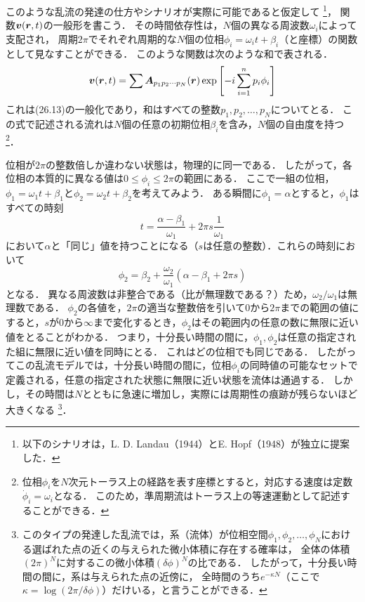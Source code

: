 このような乱流の発達の仕方やシナリオが実際に可能であると仮定して
\footnote{以下のシナリオは，L. D. Landau（1944）とE. Hopf（1948）が独立に提案した．}，
関数$\vb*{v}(\vb*{r},t)$の一般形を書こう．
その時間依存性は，$N$個の異なる周波数$\omega_i$によって支配され，
周期$2\pi$でそれぞれ周期的な$N$個の位相$\phi_i=\omega_it+\beta_i$（と座標）の関数として見なすことができる．
このような関数は次のような和で表される．
\begin{equation}
    \v(\vec{r},t) = \sum \vec{A}_{p_1p_2\cdots p_N}(\vec{r}) \exp\bqty{ -i \sum_{i=1}^{n} p_i\phi_i }
\end{equation}
これは(26.13)の一般化であり，和はすべての整数$p_1, p_2, \ldots , p_N$についてとる．
この式で記述される流れは$N$個の任意の初期位相$\beta_i$を含み，$N$個の自由度を持つ
\footnote{位相$\phi_i$を$N$次元トーラス上の経路を表す座標とすると，対応する速度は定数$\dot{\phi}_i=\omega_i$となる．
このため，準周期流はトーラス上の等速運動として記述することができる．}．



位相が$2\pi$の整数倍しか違わない状態は，物理的に同一である．
したがって，各位相の本質的に異なる値は$0 \leq \phi_i \leq 2\pi$の範囲にある．
ここで一組の位相，$\phi_1 = \omega_1t+\beta_1$と$\phi_2 = \omega_2t+\beta_2$を考えてみよう．
ある瞬間に$\phi_1=\alpha$とすると，$\phi_1$はすべての時刻
\[
    t = \frac{\alpha-\beta_1}{\omega_1} + 2\pi s\frac{1}{\omega_1}
\]
において$\alpha$と「同じ」値を持つことになる（$s$は任意の整数）．これらの時刻において
\[
    \phi_2 = \beta_2 + \frac{\omega_2}{\omega_1} (\alpha-\beta_1+2\pi s)
\]
となる．
異なる周波数は非整合である（比が無理数である？）ため，$\omega_2/\omega_1$は無理数である．
$\phi_2$の各値を，$2\pi$の適当な整数倍を引いて0から$2\pi$までの範囲の値にすると，$s$が0から$\infty$まで変化するとき，$\phi_2$はその範囲内の任意の数に無限に近い値をとることがわかる．
つまり，十分長い時間の間に，$\phi_1,\phi_2$は任意の指定された組に無限に近い値を同時にとる．
これはどの位相でも同じである．
したがってこの乱流モデルでは，十分長い時間の間に，位相$\phi_i$の同時値の可能なセットで定義される，任意の指定された状態に無限に近い状態を流体は通過する．
しかし，その時間は$N$とともに急速に増加し，実際には周期性の痕跡が残らないほど大きくなる
\footnote{
このタイプの発達した乱流では，系（流体）が位相空間$\phi_1,\phi_2,\ldots,\phi_N$における選ばれた点の近くの与えられた微小体積に存在する確率は，
全体の体積$(2\pi)^N$に対するこの微小体積$(\delta\phi)^N$の比である．
したがって，十分長い時間の間に，系は与えられた点の近傍に，
全時間のうち$e^{-\kappa N}$（ここで$\kappa=\log(2\pi/\delta\phi)$）だけいる，と言うことができる．}．



